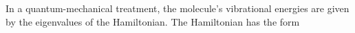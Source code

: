 In a quantum-mechanical treatment, the molecule's vibrational energies are given by the eigenvalues of the Hamiltonian. The Hamiltonian has the form
